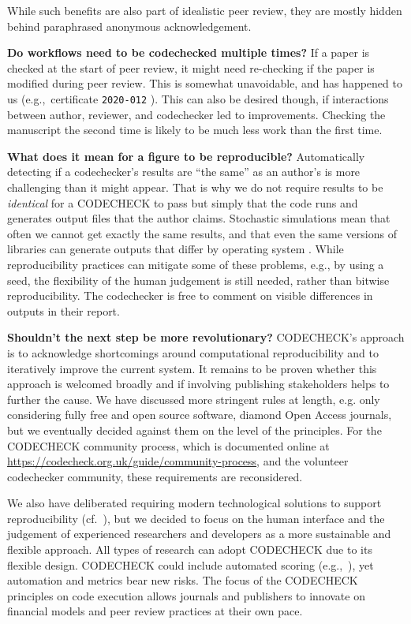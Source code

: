 \documentclass[12pt]{article}
\begin{document}
While such benefits are also part of idealistic peer review, they are
mostly hidden behind paraphrased anonymous acknowledgement.

\textbf{Do workflows need to be codechecked multiple times?}  If a
paper is checked at the start of peer review, it might need
re-checking if the paper is modified during peer review.  This is
somewhat unavoidable, and has happened to us (e.g.,~certificate
\texttt{2020-012} \cite{cert-2020-012}). This can
also be desired though, if interactions between author, reviewer,
and codechecker led to improvements.  Checking the manuscript the
second time is likely to be much less work than the first time.

\textbf{What does it mean for a figure to be reproducible?}
Automatically detecting if a codechecker's results are ``the same'' as
an author's is more challenging than it might appear.  That is why we
do not require results to be \textit{identical} for a CODECHECK to pass
but simply that the code runs and generates output files that the
author claims. Stochastic simulations mean that often we cannot get
exactly the same results, and that even the same versions of libraries
can generate outputs that differ by operating system
\cite{Gronenschild2012-pp}.  While reproducibility practices can
mitigate some of these problems, e.g., by using a seed, the
flexibility of the human judgement is still needed, rather than
bitwise reproducibility.  The codechecker is free to comment on
visible differences in outputs in their report.

\textbf{Shouldn't the next step be more revolutionary?}  CODECHECK's
approach is to acknowledge shortcomings around computational
reproducibility and to iteratively improve the current system.  It
remains to be proven whether this approach is welcomed broadly and if
involving publishing stakeholders helps to further the cause.  We have
discussed more stringent rules at length, e.g. only considering fully
free and open source software, diamond Open Access journals, but we
eventually decided against them on the level of the principles.  For
the CODECHECK community
process, which is documented online at
\url{https://codecheck.org.uk/guide/community-process},
and the volunteer codechecker community, these requirements are
reconsidered.

We also have deliberated requiring modern technological solutions to
support reproducibility (cf.~\cite{konkol_publishing_2020}), but we
decided to focus on the human interface and the judgement of
experienced researchers and developers as a more sustainable and
flexible approach.  All types of research can adopt CODECHECK due to
its flexible design.  CODECHECK could include automated scoring
(e.g.,~\cite{menke_rigor_2020}), yet automation and metrics bear new
risks.  The focus of the CODECHECK principles on code execution allows
journals and publishers to innovate on financial  models and peer
review practices at their own pace.
\end{document}
